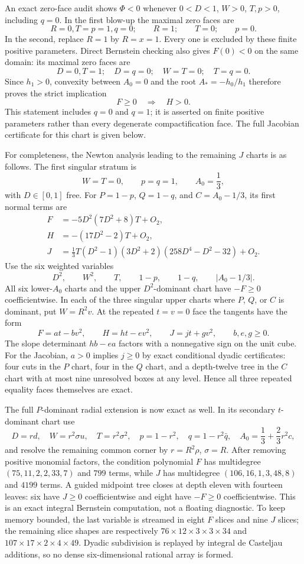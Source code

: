 \documentclass[11pt]{article}
\theoremstyle{remark}
\begin{document}
An exact zero-face audit shows $\Phi<0$ whenever
$0<D<1$, $W>0$, $T,p>0$, including $q=0$. In the first blow-up the
maximal zero faces are
\[
R=0,T=p=1,q=0;\qquad R=1;\qquad T=0;\qquad p=0.
\]
In the second, replace $R=1$ by $R=x=1$. Every one is excluded by
these finite positive parameters. Direct Bernstein checking also gives
$F(0)<0$ on the same domain: its maximal zero faces are
\[
D=0,T=1;\quad D=q=0;\quad W=T=0;\quad T=q=0.
\]
Since $h_1>0$, convexity between $A_0=0$ and the root $A_*=-h_0/h_1$
therefore proves the strict implication
\[
                   F\geq0\quad\Longrightarrow\quad H>0.
\]
This statement includes $q=0$ and $q=1$; it is asserted on finite positive
parameters rather than every degenerate compactification face. The full
Jacobian certificate for this chart is given below.

For completeness, the Newton analysis leading to the remaining $J$ charts
is as follows.  The first singular stratum is
\[
 W=T=0,\qquad p=q=1,\qquad A_0=\frac13,
\]
with $D\in[0,1]$ free.  For $P=1-p$, $Q=1-q$, and
$C=A_0-1/3$, its first normal terms are
\[
\begin{split}
 F&=-5D^2(7D^2+8)T+O_2,\\
 H&=-(17D^2-2)T+O_2,\\
 J&=\frac13T(D^2-1)(3D^2+2)(258D^4-D^2-32)+O_2.
\end{split}
\]
Use the six weighted variables
\[
 D^2,\qquad W^2,\qquad T,\qquad 1-p,\qquad
 1-q,\qquad |A_0-1/3|.
\]
All six lower-$A_0$ charts and the upper $D^2$-dominant chart have
$-F\geq0$ coefficientwise.  In each of the three singular upper charts
where $P$, $Q$, or $C$ is dominant, put $W=R^2v$.  At the repeated
$t=v=0$ face the tangents have the form
\[
 F=a t-bv^2,\qquad H=h t-ev^2,\qquad J=j t+gv^2,
 \qquad b,e,g\geq0.
\]
The slope determinant $hb-ea$ factors with a nonnegative sign on the unit
cube.  For the Jacobian, $a>0$ implies $j\geq0$ by exact conditional
dyadic certificates: four cuts in the $P$ chart, four in the $Q$ chart,
and a depth-twelve tree in the $C$ chart with at most nine unresolved
boxes at any level.  Hence all three repeated equality faces themselves
are exact.

The full $P$-dominant radial extension is now exact as well.  In its
secondary $t$-dominant chart use
\[
 D=rd,\quad W=r^2\sigma u,\quad T=r^2\sigma^2,\quad
 p=1-r^2,\quad q=1-r^2\bar q,\quad
 A_0=\frac13+\frac23r^2c,
\]
and resolve the remaining common corner by
$r=R^2\rho$, $\sigma=R$.  After removing positive monomial factors,
the condition polynomial $F$ has multidegree
$(75,11,2,2,33,7)$ and $799$ terms, while $J$ has multidegree
$(106,16,1,3,48,8)$ and $4199$ terms.  A guided midpoint tree closes at
depth eleven with fourteen leaves: six have $J\geq0$ coefficientwise and
eight have $-F\geq0$ coefficientwise.  This is an exact integral
Bernstein computation, not a floating diagnostic.  To keep memory bounded,
the last variable is streamed in eight $F$ slices and nine $J$ slices; the
remaining slice shapes are respectively
$76\mathbin\times12\mathbin\times3\mathbin\times3\mathbin\times34$
and
$107\mathbin\times17\mathbin\times2\mathbin\times4\mathbin\times49$.
Dyadic subdivision is replayed by integral de Casteljau additions, so no
dense six-dimensional rational array is formed.
\end{document}
